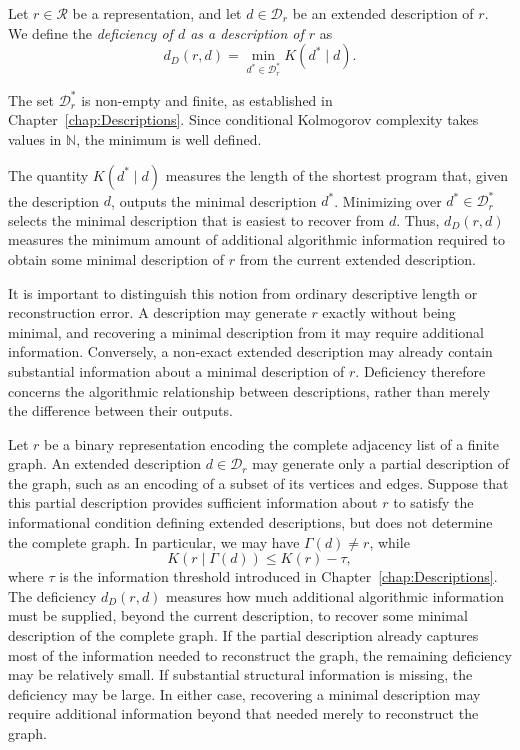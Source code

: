 \begin{definition}
\label{def:deficiency_description}
Let $r\in\mathcal R$ be a representation, and let $d\in\mathcal D_r$ be an extended description of $r$. We define the \emph{deficiency of $d$ as a description of $r$} as
\[
d_D(r,d) = \min_{d^\ast\in\mathcal D_r^\ast}K(d^\ast\mid d).
\]
\end{definition}

The set $\mathcal D_r^\ast$ is non-empty and finite, as established in Chapter~\ref{chap:Descriptions}. Since conditional Kolmogorov complexity takes values in $\mathbb N$, the minimum is well defined.

The quantity $K(d^\ast\mid d)$ measures the length of the shortest program that, given the description $d$, outputs the minimal description $d^\ast$. Minimizing over $d^\ast\in\mathcal D_r^\ast$ selects the minimal description that is easiest to recover from $d$. Thus, $d_D(r,d)$ measures the minimum amount of additional algorithmic information required to obtain some minimal description of $r$ from the current extended description.

It is important to distinguish this notion from ordinary descriptive length or reconstruction error. A description may generate $r$ exactly without being minimal, and recovering a minimal description from it may require additional information. Conversely, a non-exact extended description may already contain substantial information about a minimal description of $r$. Deficiency therefore concerns the algorithmic relationship between descriptions, rather than merely the difference between their outputs.

\begin{example}
\label{ex:deficiency_description}
Let $r$ be a binary representation encoding the complete adjacency list of a finite graph. An extended description $d\in\mathcal D_r$ may generate only a partial description of the graph, such as an encoding of a subset of its vertices and edges. Suppose that this partial description provides sufficient information
about $r$ to satisfy the informational condition defining extended descriptions, but does not determine the complete graph. In particular, we may have $\Gamma(d)\neq r$, while
\[
K(r\mid\Gamma(d))\le K(r)-\tau,
\]
where $\tau$ is the information threshold introduced in Chapter~\ref{chap:Descriptions}. The deficiency $d_D(r,d)$ measures how much additional algorithmic information must be supplied, beyond the current description, to recover some minimal description of the complete graph. If the partial description already captures most of the information needed to reconstruct the graph, the remaining deficiency may be relatively small. If substantial structural information is missing, the deficiency may be large. In either case, recovering a minimal description may require additional information beyond that needed merely to reconstruct the graph.
\end{example}

